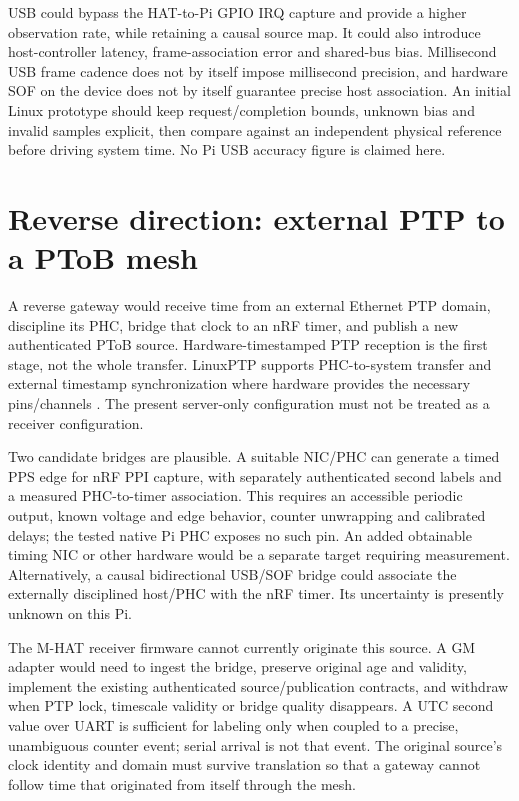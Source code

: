 \documentclass[10pt,letterpaper]{article}
\begin{document}
USB could bypass the HAT-to-Pi GPIO IRQ capture and provide a higher observation
rate, while retaining a causal source map. It could also introduce host-controller
latency, frame-association error and shared-bus bias. Millisecond USB frame cadence
does not by itself impose millisecond precision, and hardware SOF on the device
does not by itself guarantee precise host association. An initial Linux prototype
should keep request/completion bounds, unknown bias and invalid samples explicit,
then compare against an independent physical reference before driving system
time. No Pi USB accuracy figure is claimed here.

\section{Reverse direction: external PTP to a PToB mesh}
A reverse gateway would receive time from an external Ethernet PTP domain,
discipline its PHC, bridge that clock to an nRF timer, and publish a new
authenticated PToB source. Hardware-timestamped PTP reception is the first
stage, not the whole transfer. LinuxPTP supports PHC-to-system transfer and
external timestamp synchronization where hardware provides the necessary
pins/channels \cite{phc2sys,ts2phc}. The present server-only configuration must
not be treated as a receiver configuration.

Two candidate bridges are plausible. A suitable NIC/PHC can generate a timed
PPS edge for nRF PPI capture, with separately authenticated second labels and
a measured PHC-to-timer association. This requires an accessible periodic output,
known voltage and edge behavior, counter unwrapping and calibrated delays;
the tested native Pi PHC exposes no such pin. An added obtainable timing NIC or
other hardware would be a separate target requiring measurement. Alternatively,
a causal bidirectional USB/SOF bridge could associate the externally disciplined
host/PHC with the nRF timer. Its uncertainty is presently unknown on this Pi.

The M-HAT receiver firmware cannot currently originate this source. A GM adapter
would need to ingest the bridge, preserve original age and validity, implement
the existing authenticated source/publication contracts, and withdraw when PTP
lock, timescale validity or bridge quality disappears. A UTC second value over
UART is sufficient for labeling only when coupled to a precise, unambiguous
counter event; serial arrival is not that event. The original source's clock
identity and domain must survive translation so that a gateway cannot follow
time that originated from itself through the mesh.
\end{document}
